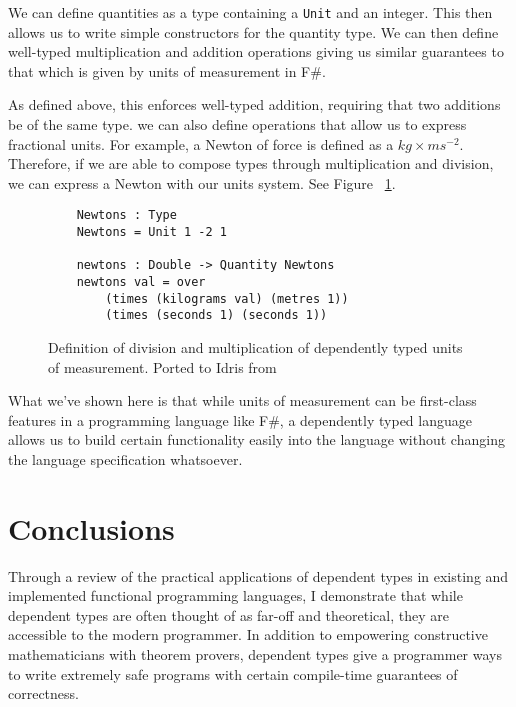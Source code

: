 We can define quantities as a type containing a \texttt{Unit} and an integer.
This then allows us to write simple constructors for the quantity type. We can
then define well-typed multiplication and addition operations giving us similar
guarantees to that which is given by units of measurement in F\#. 

As defined above, this enforces well-typed addition, requiring that two
additions be of the same type. we can also define operations that allow us to
express fractional units. For example, a Newton of force is defined as a
$kg\times ms^{-2}$. Therefore, if we are able to compose types through
multiplication and division, we can express a Newton with our units system. See
Figure ~\ref{division}. 

\begin{figure}[h]
  \caption{Definition of division and multiplication of dependently typed units
  of measurement. Ported to Idris from \cite{gundry2013}}
  \label{division}
  \begin{lstlisting}
    Newtons : Type
    Newtons = Unit 1 -2 1

    newtons : Double -> Quantity Newtons
    newtons val = over 
        (times (kilograms val) (metres 1)) 
        (times (seconds 1) (seconds 1))
  \end{lstlisting}
\end{figure}

What we've shown here is that while units of measurement can be first-class
features in a programming language like F\#, a dependently typed language allows
us to build certain functionality easily into the language without changing the
language specification whatsoever. 

\section{Conclusions}
Through a review of the practical applications of dependent types in existing
and implemented functional programming languages, I demonstrate that while
dependent types are often thought of as far-off and theoretical, they are
accessible to the modern programmer. In addition to empowering constructive
mathematicians with theorem provers, dependent types give a programmer ways to
write extremely safe programs with certain compile-time guarantees of
correctness. 
